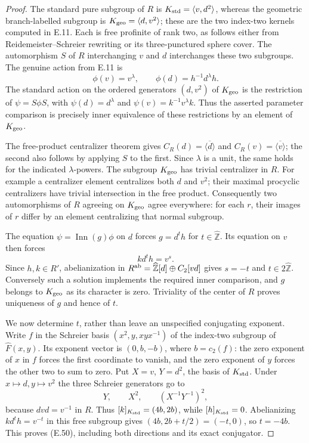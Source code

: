 \begin{proof}
The standard pure subgroup of $R$ is
$K_{\rm std}=\langle v,d^2\rangle$, whereas the geometric
branch-labelled subgroup is
$K_{\rm geo}=\langle d,v^2\rangle$; these are the two
index-two kernels computed in E.11.  Each is free
profinite of rank two, as follows either from
Reidemeister--Schreier rewriting or its three-punctured
sphere cover.  The automorphism $S$ of $R$ interchanging
$v$ and $d$ interchanges these two subgroups.
The genuine action from E.11 is
\[
 \phi(v)=v^\lambda,\qquad \phi(d)=h^{-1}d^\lambda h.
\]
The standard action on the ordered generators $(d,v^2)$
of $K_{\rm geo}$ is the restriction of
$\psi=S\phi S$, with
$\psi(d)=d^\lambda$ and $\psi(v)=k^{-1}v^\lambda k$.
Thus the asserted parameter comparison is precisely
inner equivalence of these restrictions by an element
of $K_{\rm geo}$.

The free-product centralizer theorem gives
$C_R(d)=\overline{\langle d\rangle}$ and
$C_R(v)=\overline{\langle v\rangle}$; the second also
follows by applying $S$ to the first.  Since $\lambda$
is a unit, the same holds for the indicated
$\lambda$-powers.  The subgroup $K_{\rm geo}$ has
trivial centralizer in $R$.  For example a centralizer
element centralizes both $d$ and $v^2$; their maximal
procyclic centralizers have trivial intersection in
the free product.  Consequently two automorphisms of
$R$ agreeing on $K_{\rm geo}$ agree everywhere:
for each $r$, their images of $r$ differ by an element
centralizing that normal subgroup.

The equation $\psi=\operatorname{Inn}(g)\phi$ on $d$
forces $g=d^t h$ for $t\in\widehat{\mathbb Z}$.
Its equation on $v$ then forces
\[
                k d^t h=v^s.
\]
Since $h,k\in R'$, abelianization in
$R^{\rm ab}=\widehat{\mathbb Z}[d]\oplus C_2[vd]$
gives $s=-t$ and $t\in2\widehat{\mathbb Z}$.
Conversely such a solution implements the required
inner comparison, and $g$ belongs to $K_{\rm geo}$
as its character is zero.  Triviality of the center
of $R$ proves uniqueness of $g$ and hence of $t$.

We now determine $t$, rather than leave an unspecified
conjugating exponent.  Write $f$ in the Schreier basis
$(x^2,y,xyx^{-1})$ of the index-two subgroup of
$\widehat F(x,y)$.  Its exponent vector is
$(0,b,-b)$, where $b=c_2(f)$: the zero exponent of
$x$ in $f$ forces the first coordinate to vanish,
and the zero exponent of $y$ forces the other two
to sum to zero.  Put $X=v$, $Y=d^2$, the basis of
$K_{\rm std}$.  Under $x\mapsto d,y\mapsto v^2$
the three Schreier generators go to
\[
 Y,\qquad X^2,\qquad (X^{-1}Y^{-1})^2,
\]
because $dvd=v^{-1}$ in $R$.  Thus
$[k]_{K_{\rm std}}=(4b,2b)$, while
$[h]_{K_{\rm std}}=0$.  Abelianizing
$kd^th=v^{-t}$ in this free subgroup gives
$(4b,2b+t/2)=(-t,0)$, so $t=-4b$.
This proves (E.50), including both directions and
its exact conjugator.


\end{proof}
